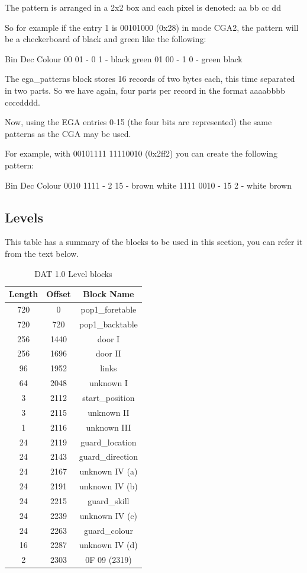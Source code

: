 \documentclass{article}
\begin{document}
 The pattern is arranged in a 2x2 box and each pixel is denoted:
  aa bb
  cc dd
 
 So for example if the entry 1 is 00101000 (0x28) in mode CGA2, the pattern
 will be a checkerboard of black and green like the following:

  Bin       Dec     Colour
  00 01  -  0 1  -  black  green
  01 00  -  1 0  -  green  black

 The ega\_patterns block stores 16 records of two bytes each, this time
 separated in two parts. So we have again, four parts per record in the
 format aaaabbbb ccccdddd.
 
 Now, using the EGA entries 0-15 (the four bits are represented) the same
 patterns as the CGA may be used.
 
 For example, with 00101111 11110010 (0x2ff2) you can create the following
 pattern:

  Bin           Dec       Colour
  0010 1111  -  2  15  -  brown  white
  1111 0010  -  15 2   -  white  brown

\subsection{Levels \label{level blocks}}
 This table has a summary of the blocks to be used in this section,
 you can refer it from the text below.

\begin{table}
\begin{tabular}{ccc}
\hline
  Length& Offset & Block Name \\
\hline
  720   & 0      & pop1\_foretable \\
  720   & 720    & pop1\_backtable \\
\index{foretable}
\index{backtable}
  256   & 1440   & door I \\
  256   & 1696   & door II \\
  96    & 1952   & links \\
  64    & 2048   & unknown I \\
  3     & 2112   & start\_position \\
  3     & 2115   & unknown II \\
  1     & 2116   & unknown III \\
  24    & 2119   & guard\_location \\
  24    & 2143   & guard\_direction \\
  24    & 2167   & unknown IV (a) \\
  24    & 2191   & unknown IV (b) \\
  24    & 2215   & guard\_skill \\
  24    & 2239   & unknown IV (c) \\
  24    & 2263   & guard\_colour \\
  16    & 2287   & unknown IV (d) \\
  2     & 2303   & 0F 09 (2319) \\
\hline
\end{tabular}
\caption{DAT 1.0 Level blocks}
\label{dat1 level}
\end{table}
\end{document}
